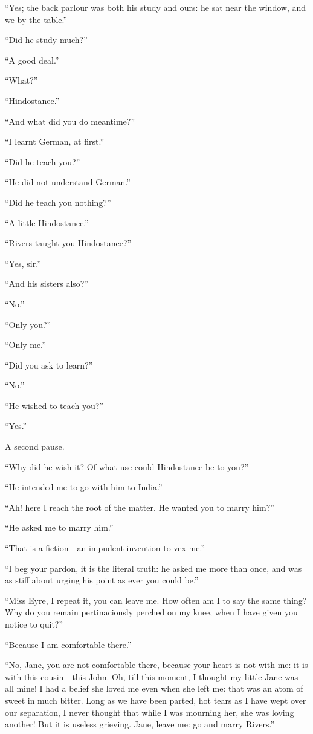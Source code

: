 \enquote{Yes; the back parlour was both his study and ours: he sat near
the window, and we by the table.}

\enquote{Did he study much?}

\enquote{A good deal.}

\enquote{What?}

\enquote{Hindostanee.}

\enquote{And what did you do meantime?}

\enquote{I learnt German, at first.}

\enquote{Did he teach you?}

\enquote{He did not understand German.}

\enquote{Did he teach you nothing?}

\enquote{A little Hindostanee.}

\enquote{Rivers taught you Hindostanee?}

\enquote{Yes, sir.}

\enquote{And his sisters also?}

\enquote{No.}

\enquote{Only you?}

\enquote{Only me.}

\enquote{Did you ask to learn?}

\enquote{No.}

\enquote{He wished to teach you?}

\enquote{Yes.}

A second pause.

\enquote{Why did he wish it? Of what use could Hindostanee be to you?}

\enquote{He intended me to go with him to India.}

\enquote{Ah! here I reach the root of the matter. He wanted you to
marry him?}

\enquote{He asked me to marry him.}

\enquote{That is a fiction---an impudent invention to vex me.}

\enquote{I beg your pardon, it is the literal truth: he asked me more
than once, and was as stiff about urging his point as ever you could
be.}

\enquote{Miss Eyre, I repeat it, you can leave me. How often am I to
say the same thing? Why do you remain pertinaciously perched on my
knee, when I have given you notice to quit?}

\enquote{Because I am comfortable there.}

\enquote{No, Jane, you are not comfortable there, because your heart is
not with me: it is with this cousin---this \St{} John. Oh, till this
moment, I thought my little Jane was all mine! I had a belief she loved
me even when she left me: that was an atom of sweet in much bitter. 
Long as we have been parted, hot tears as I have wept over our
separation, I never thought that while I was mourning her, she was
loving another! But it is useless grieving. Jane, leave me: go and
marry Rivers.}

